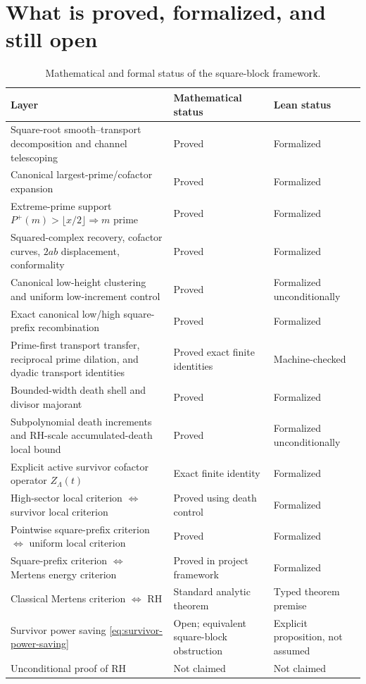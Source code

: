 \documentclass[11pt]{article}
\theoremstyle{definition}
\newcommand{\1}{\mathbf{1}}
\begin{document}
\section{What is proved, formalized, and still open}
\label{sec:status}

\begin{table}[htbp]
\centering
\caption{Mathematical and formal status of the square-block framework.}
\label{tab:status}
\small
\renewcommand{\arraystretch}{1.20}
\begin{tabular}{>{\raggedright\arraybackslash}p{}
                >{\raggedright\arraybackslash}p{}
                >{\raggedright\arraybackslash}p{}}
\toprule
Layer & Mathematical status & Lean status\\
\midrule
Square-root smooth--transport decomposition and channel telescoping
& Proved & Formalized\\
Canonical largest-prime/cofactor expansion
& Proved & Formalized\\
Extreme-prime support $P^+(m)>\lfloor x/2\rfloor\Rightarrow m$ prime
& Proved & Formalized\\
Squared-complex recovery, cofactor curves, $2ab$ displacement, conformality
& Proved & Formalized\\
Canonical low-height clustering and uniform low-increment control
& Proved & Formalized unconditionally\\
Exact canonical low/high square-prefix recombination
& Proved & Formalized\\
Prime-first transport transfer, reciprocal prime dilation, and dyadic transport identities
& Proved exact finite identities & Machine-checked\\
Bounded-width death shell and divisor majorant
& Proved & Formalized\\
Subpolynomial death increments and RH-scale accumulated-death local bound
& Proved & Formalized unconditionally\\
Explicit active survivor cofactor operator $Z_\Lambda(t)$
& Exact finite identity & Formalized\\
High-sector local criterion $\Longleftrightarrow$ survivor local criterion
& Proved using death control & Formalized\\
Pointwise square-prefix criterion $\Longleftrightarrow$ uniform local criterion
& Proved & Formalized\\
Square-prefix criterion $\Longleftrightarrow$ Mertens energy criterion
& Proved in project framework & Formalized\\
Classical Mertens criterion $\Longleftrightarrow$ RH
& Standard analytic theorem & Typed theorem premise\\
Survivor power saving \cref{eq:survivor-power-saving}
& Open; equivalent square-block obstruction & Explicit proposition, not assumed\\
Unconditional proof of RH
& Not claimed & Not claimed\\
\bottomrule
\end{tabular}
\end{table}
\end{document}
